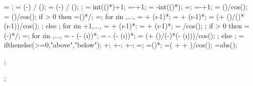 {{%
\loadarrownumbermo = ;
\arrlenratioleft = (\midratioleft-\loadstartratio) / (\arrforceratio);
\arrlenratioright = (\midratioright-\loadendratio) / (\arrforceratio);
;
\leftendarrno = int(()*\arrlenratioleft)+1;
\nleftarrows=\leftendarrno-\leftstartarrno+1;
\rightstartarrno = \loadarrownumber-int(()*\arrlenratioright);
\rightendarrno=\loadarrownumbermo;
\nrightarrows=\rightendarrno-\rightstartarrno+1;
 = (\loadarrowheightleft)/cos(\extraangle);
\loadarrowheight{\loadarrownumber} = (\loadarrowheightright)/cos(\extraangle);
if \nleftarrows > 0 then {
\leftendarrratio=()*\loadwxvalue/\loaddxaleft;
\dahleftend=\leftendarrratio*\dahleft;
for \i in {\leftstartarrno,...,{\leftendarrno}}{
\loadxvalue{\i} =  + (\i-1)*\loadwxvalue;
\loadyvalue{\i} =  + (\i-1)*\loadwyvalue;
\loadarrowheight{\i} = (\loadarrowheightleft + (\dahleftend)/()*(\i-1))/cos(\extraangle);
};} else {};
for \i in {{\leftendarrno+1},...,{}}{
	\loadxvalue{\i} =  + (\i-1)*\loadwxvalue;
	\loadyvalue{\i} =  + (\i-1)*\loadwyvalue;
	\loadarrowheight{\i} = \loadarrowheightmid/cos(\extraangle);
};
if \nleftarrows > 0 then {
\rightstartarrratio=(\loadarrownumber-\rightstartarrno)*\loadwxvalue/\loaddxaright;
\dahrightstart=\rightstartarrratio*\dahright;
for \i in {{\rightendarrno},...,{\rightstartarrno}}{
\loadxvalue{\i} = \loadxvalue{\loadarrownumber} - (\loadarrownumber - (\i))*\loadwxvalue;
\loadyvalue{\i} = \loadyvalue{\loadarrownumber} - (\loadarrownumber - (\i))*\loadwyvalue;
\loadarrowheight{\i} = (\loadarrowheightright + (\dahrightstart)/(\loadarrownumber-\rightstartarrno)*(\loadarrownumber - (\i)))/cos(\extraangle);
};} else {};
\loc = ifthenelse(\loadarrowheightleft>=0,"above","below");
+\loadangle;
+\loadangle-\extraangle;
+\loadangle-\extraangle;
\ninetya=\ninetyfac*\ninetydim;
\ninetyb=()*\ninetydim;
\totanglen=(\loadarrowheight{\drawanglei} + \angsp + \anglen)/cos(\extraangle);
\absextraangle=abs(\extraangle);
}


;

;

}

